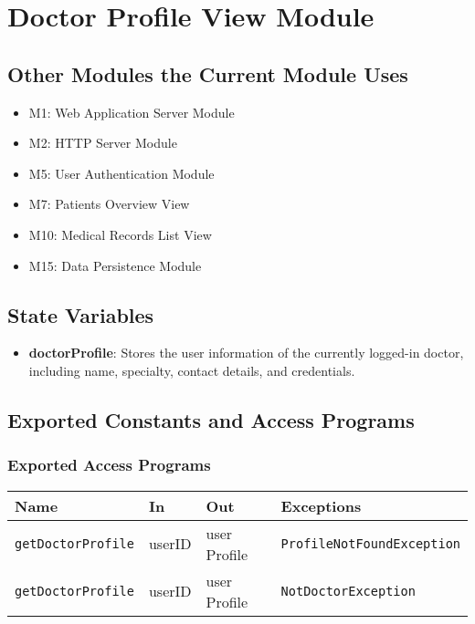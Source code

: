 \documentclass[12pt, titlepage]{article}
\begin{document}
\section{Doctor Profile View Module}

\subsection{Other Modules the Current Module Uses}
\begin{itemize}
    \item M1: Web Application Server Module
    \item M2: HTTP Server Module
    \item M5: User Authentication Module
    \item M7: Patients Overview View
    \item M10: Medical Records List View
    \item M15: Data Persistence Module
\end{itemize}

\subsection{State Variables}
\begin{itemize}
    \item \textbf{doctorProfile}: Stores the user information of the currently logged-in doctor, including name, specialty, contact details, and credentials.
\end{itemize}

\subsection{Exported Constants and Access Programs}
\subsubsection{Exported Access Programs}
\begin{tabular}{|l|l|l|l|}
    \hline
    \textbf{Name} & \textbf{In} & \textbf{Out} & \textbf{Exceptions} \\
    \hline 
    \texttt{getDoctorProfile} & userID & user Profile & \texttt{ProfileNotFoundException} \\
    \hline
    \texttt{getDoctorProfile} & userID & user Profile & \texttt{NotDoctorException } \\
    \hline
\end{tabular}
\end{document}
